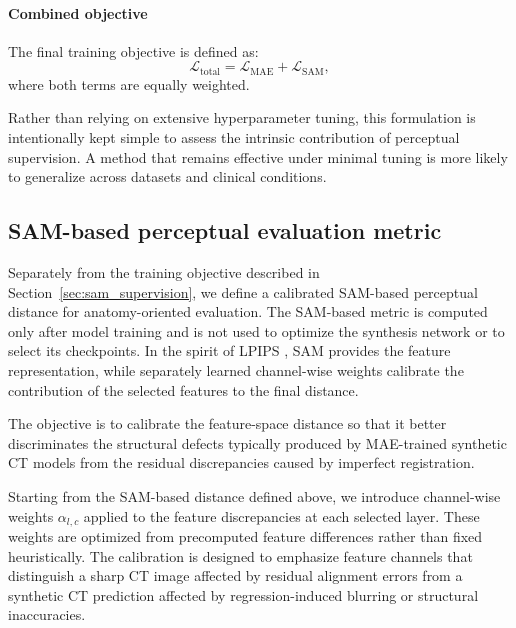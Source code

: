 \documentclass[lettersize,journal]{IEEEtran}
\begin{document}
\paragraph{Combined objective}
The final training objective is defined as:
\begin{equation}
\mathcal{L}_{\text{total}} = \mathcal{L}_{\text{MAE}} + \mathcal{L}_{\text{SAM}},
\end{equation}
where both terms are equally weighted.

Rather than relying on extensive hyperparameter tuning, this formulation is intentionally kept simple to assess the intrinsic contribution of perceptual supervision. 
A method that remains effective under minimal tuning is more likely to generalize across datasets and clinical conditions.

\subsection{SAM-based perceptual evaluation metric}
\label{sec:sam_metric}

Separately from the training objective described in Section~\ref{sec:sam_supervision}, we define a calibrated SAM-based perceptual distance for anatomy-oriented evaluation. The SAM-based metric is computed only after model training and is not used to optimize the synthesis network or to select its checkpoints. In the spirit of LPIPS \cite{zhang2018unreasonable}, SAM provides the feature representation, while separately learned channel-wise weights calibrate the contribution of the selected features to the final distance.

The objective is to calibrate the feature-space distance so that it better discriminates the structural defects typically produced by MAE-trained synthetic CT models from the residual discrepancies caused by imperfect registration.

Starting from the SAM-based distance defined above, we introduce channel-wise weights $\alpha_{l,c}$ applied to the feature discrepancies at each selected layer. These weights are optimized from precomputed feature differences rather than fixed heuristically. The calibration is designed to emphasize feature channels that distinguish a sharp CT image affected by residual alignment errors from a synthetic CT prediction affected by regression-induced blurring or structural inaccuracies.
\end{document}
